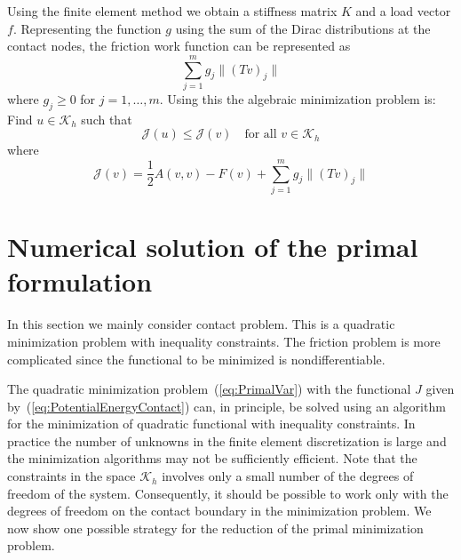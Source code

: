 \documentclass[12pt,a4paper]{article}
\numberwithin{equation}{section}
\numberwithin{table}{section}
\numberwithin{figure}{section}
\newcommand{\J}{\ensuremath{\mathcal{J}}}
\newcommand{\half}{\ensuremath{\frac{1}{2}}}
\newcommand{\K}{\ensuremath{\mathcal{K}}}
\newcommand{\Kh}{\ensuremath{\K_h}}
\providecommand{\norm}[1]{\lVert #1 \rVert}
\newcommand{\qforall}{\quad\text{for all }}
\begin{document}
Using the finite element method we obtain a stiffness matrix $K$ and a load vector $f$.
Representing the function $g$ using the sum of the Dirac distributions at the contact
nodes, the friction work function can be represented as
\begin{equation}
  \label{eq:3}
  \sum_{j=1}^m g_j \norm{(T v)_j}
\end{equation}
where $g_j \ge 0$ for $j=1,\dots,m$.  Using this the algebraic minimization problem is:
Find $u\in\Kh$ such that
\begin{equation}
  \label{eq:5}
  \J(u) \le \J(v) \qforall v\in\Kh
\end{equation}
where
\begin{equation}
  \label{eq:8}
  \J(v) = \half A(v,v) - F(v) + \sum_{j=1}^m g_j \norm{(T v)_j}
\end{equation}



\section{Numerical solution of the primal formulation}
\label{sec:numer-solut-prim}

In this section we mainly consider contact problem. This is a quadratic minimization
problem with inequality constraints.  The friction problem is more complicated since the
functional to be minimized is nondifferentiable.

The quadratic minimization problem~(\ref{eq:PrimalVar}) with the functional $J$ given
by~(\ref{eq:PotentialEnergyContact}) can, in principle, be solved using an algorithm for
the minimization of quadratic functional with inequality constraints.  In practice the
number of unknowns in the finite element discretization is large and the minimization
algorithms may not be sufficiently efficient.  Note that the constraints in the space $\Kh$
involves only a small number of the degrees of freedom of the system.  Consequently, it
should be possible to work only with the degrees of freedom on the contact boundary in the
minimization problem.  We now show one possible strategy for the reduction of the
primal minimization problem.
\end{document}
